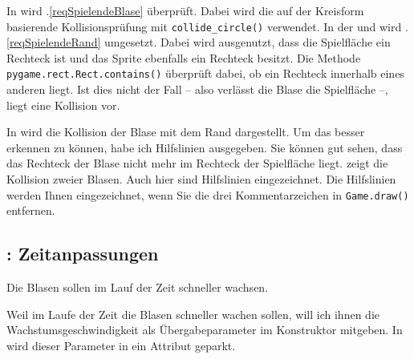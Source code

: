 
In  wird .\ref{reqSpielendeBlase} überprüft. Dabei wird die auf der Kreisform basierende Kollisionsprüfung mit \texttt{collide\_circle()} verwendet. In der  und  wird .\ref{reqSpielendeRand} umgesetzt. Dabei wird ausgenutzt, dass die Spielfläche ein Rechteck ist und das Sprite ebenfalls ein Rechteck besitzt. Die Methode \texttt{pygame.rect.Rect.\-con\-tains()} überprüft dabei, ob ein Rechteck innerhalb eines anderen liegt. Ist dies nicht der Fall -- also verlässt die Blase die Spielfläche --, liegt eine Kollision vor.

\newpage


In  wird die Kollision der Blase mit dem Rand dargestellt. Um das besser erkennen zu können, habe ich Hilfslinien ausgegeben. Sie können gut sehen, dass das Rechteck der Blase nicht mehr im Rechteck der Spielfläche liegt.  zeigt die Kollision zweier Blasen. Auch hier sind Hilfslinien eingezeichnet. Die Hilfslinien werden Ihnen eingezeichnet, wenn Sie die drei Kommentarzeichen in \texttt{Game.draw()} entfernen.



\subsection{: Zeitanpassungen}
	Die Blasen sollen im Lauf der Zeit schneller wachsen.
\er

Weil im Laufe der Zeit die Blasen schneller wachen sollen, will ich ihnen die Wachstumsgeschwindigkeit als Übergabeparameter im Konstruktor mitgeben. In  wird dieser Parameter in ein Attribut geparkt.


